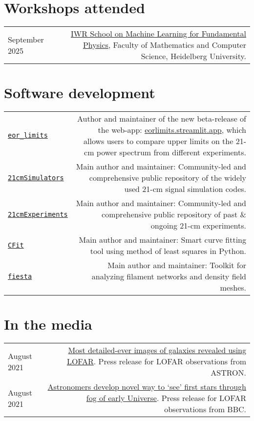 \documentclass{article}
\begin{document}
\section*{Workshops attended}
\begin{longtable}{L!{\vrule}R}
    September 2025 & \href{https://indico.physi.uni-heidelberg.de/event/1053/}{IWR School on Machine Learning for Fundamental Physics}, Faculty of Mathematics and Computer Science, Heidelberg University. \\

\end{longtable}

\section*{Software development}

\begin{longtable}{L!{\vrule}R}
  \href{https://github.com/JitenDhandha/eor_limits}{\texttt{eor\_limits}} & Author and maintainer of the new beta-release of the web-app: \href{https://eorlimits.streamlit.app/}{eorlimits.streamlit.app}, which allows users to compare upper limits on the 21-cm power spectrum from different experiments.\\
  \href{https://github.com/JitenDhandha/21cmSimulators}{\texttt{21cmSimulators}} & Main author and maintainer: Community-led and comprehensive public repository of the widely used 21-cm signal simulation codes. \\
  \href{https://github.com/JitenDhandha/21cmExperiments}{\texttt{21cmExperiments}} & Main author and maintainer: Community-led and comprehensive public repository of past \& ongoing 21-cm experiments. \\
	\href{https://github.com/JitenDhandha/CFit}{\texttt{CFit}} & Main author and maintainer: Smart curve fitting tool using method of least squares in Python.\\
	\href{https://fiesta-astro.readthedocs.io}{\texttt{fiesta}} & Main author and maintainer: Toolkit for analyzing filament networks and density field meshes. \\
\end{longtable}

\section*{In the media}

\begin{longtable}{L!{\vrule}R}
	August 2021 & \href{https://www.astron.nl/most-detailed-ever-images-of-galaxies-revealed-using-lofar }{Most detailed-ever images of galaxies revealed using LOFAR}. Press release for LOFAR observations from ASTRON. \\
	August 2021 & \href{https://www.bbc.co.uk/news/science-environment-57998940}{Astronomers develop novel way to `see' first stars through fog of early Universe}. Press release for LOFAR observations from BBC. \\
\end{longtable}
\end{document}
